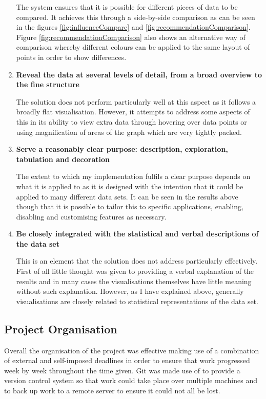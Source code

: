 \documentclass[12pt,a4paper]{article}
\begin{document}
\begin{enumerate}
The system ensures that it is possible for different pieces of data to be compared. It achieves this through a side-by-side comparison as can be seen in the figures \ref{fig:influenceCompare} and \ref{fig:recommendationComparison}. Figure \ref{fig:recommendationComparison} also shows an alternative way of comparison whereby different colours can be applied to the same layout of points in order to show differences.

\item {\bf Reveal the data at several levels of detail, from a broad overview to the fine structure}

The solution does not perform particularly well at this aspect as it follows a broadly flat visualisation. However, it attempts to address some aspects of this in its ability to view extra data through hovering over data points or using magnification of areas of the graph which are very tightly packed.

\item {\bf Serve a reasonably clear purpose: description, exploration, tabulation and decoration}

The extent to which my implementation fulfils a clear purpose depends on what it is applied to as it is designed with the intention that it could be applied to many different data sets. It can be seen in the results above though that it is possible to tailor this to specific applications, enabling, disabling and customising features as necessary.

\item {\bf Be closely integrated with the statistical and verbal descriptions of the data set}

This is an element that the solution does not address particularly effectively. First of all little thought was given to providing a verbal explanation of the results and in many cases the visualisations themselves have little meaning without such explanation. However, as I have explained above, generally visualisations are closely related to statistical representations of the data set.
\end{enumerate}

\subsection{Project Organisation}
\noindent
Overall the organisation of the project was effective making use of a combination of external and self-imposed deadlines in order to ensure that work progressed week by week throughout the time given. Git was made use of to provide a version control system so that work could take place over multiple machines and to back up work to a remote server to ensure it could not all be lost.
\end{document}
